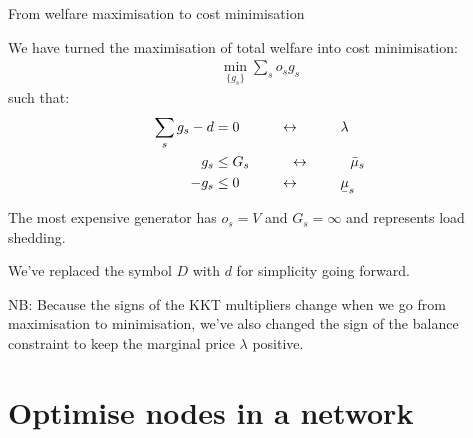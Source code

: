 \documentclass[10pt,dvipsnames]{beamer}
\def\l{\lambda}
\def\m{\mu}
\newcommand{\ubar}[1]{\text{\b{$#1$}}}
\begin{document}
\begin{frame}{From welfare maximisation to cost minimisation}

 We have  turned the maximisation of total welfare into \alert{cost minimisation}:
  \begin{align*}
    \min_{\{g_s\}}  \sum_s o_s g_s
  \end{align*}
  such that:
  \begin{align*}
    \sum_s g_s - d & = 0  \hspace{1cm}\leftrightarrow\hspace{1cm} \l \\
        g_s  & \leq  G_s  \hspace{1cm}\leftrightarrow\hspace{1cm} \bar{\m}_s \\
    - g_s  & \leq  0  \hspace{1cm}\leftrightarrow\hspace{1cm} \ubar{\m}_s
  \end{align*}

  The most expensive generator has $o_s = V$ and $G_s = \infty$ and
  represents \alert{load shedding}.

  We've replaced the symbol $D$  with $d$ for simplicity going forward.



  NB: Because the signs of the KKT multipliers change when we go from
  maximisation to minimisation, we've also changed the sign of the
  balance constraint to keep the marginal price $\l$ positive.
\end{frame}


\section{Optimise nodes in a network}
\end{document}
